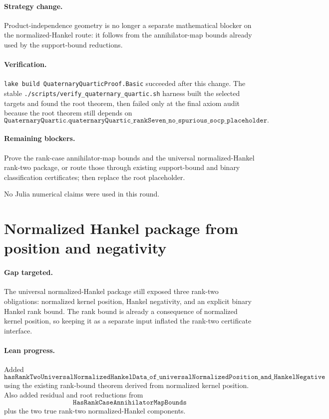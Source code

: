 \documentclass[11pt]{article}
\begin{document}
\paragraph{Strategy change.}
Product-independence geometry is no longer a separate mathematical blocker on
the normalized-Hankel route: it follows from the annihilator-map bounds already
used by the support-bound reductions.

\paragraph{Verification.}
\texttt{lake build QuaternaryQuarticProof.Basic} succeeded after this change.
The stable \texttt{./scripts/verify\_quaternary\_quartic.sh} harness built the
selected targets and found the root theorem, then failed only at the final axiom
audit because the root theorem still depends on
\[
\texttt{QuaternaryQuartic.quaternaryQuartic\_rankSeven\_no\_spurious\_socp\_placeholder}.
\]

\paragraph{Remaining blockers.}
Prove the rank-case annihilator-map bounds and the universal normalized-Hankel
rank-two package, or route those through existing support-bound and binary
classification certificates; then replace the root placeholder.

No Julia numerical claims were used in this round.

\section*{Normalized Hankel package from position and negativity}

\paragraph{Gap targeted.}
The universal normalized-Hankel package still exposed three rank-two
obligations: normalized kernel position, Hankel negativity, and an explicit
binary Hankel rank bound.  The rank bound is already a consequence of
normalized kernel position, so keeping it as a separate input inflated the
rank-two certificate interface.

\paragraph{Lean progress.}
Added
\[
\texttt{hasRankTwoUniversalNormalizedHankelData\_of\_universalNormalizedPosition\_and\_HankelNegative}
\]
using the existing rank-bound theorem derived from normalized kernel position.
Also added residual and root reductions from
\[
\texttt{HasRankCaseAnnihilatorMapBounds}
\]
plus the two true rank-two normalized-Hankel components.
\end{document}
